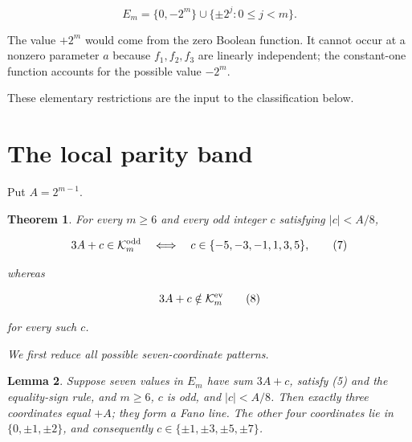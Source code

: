 \documentclass[11pt]{article}
\newtheorem{theorem}{Theorem}
\newtheorem{lemma}[theorem]{Lemma}
\begin{document}
\[
E_m=\{0,-2^m\}\cup\{\pm2^j:0\leq j<m\}.
\tag{6}
\]

The value $+2^m$ would come from the zero Boolean function. It cannot occur at a nonzero parameter
$a$ because $f_1,f_2,f_3$ are linearly independent; the constant-one function accounts for the
possible value $-2^m$.

These elementary restrictions are the input to the classification below.

\section{The local parity band}


Put $A=2^{m-1}$.

\begin{theorem}


For every $m\geq6$ and every odd integer $c$ satisfying $|c|<A/8$,

\[
3A+c\in\mathcal K_m^{\rm odd}
\quad\Longleftrightarrow\quad
c\in\{-5,-3,-1,1,3,5\},
\tag{7}
\]

whereas

\[
3A+c\notin\mathcal K_m^{\rm ev}
\tag{8}
\]

for every such $c$.

We first reduce all possible seven-coordinate patterns.

\end{theorem}

\begin{lemma}


Suppose seven values in $E_m$ have sum $3A+c$, satisfy (5) and the equality-sign rule, and
$m\geq6$, $c$ is odd, and $|c|<A/8$. Then exactly three coordinates equal $+A$; they form a
Fano line. The other four coordinates lie in $\{0,\pm1,\pm2\}$, and consequently
$c\in\{\pm1,\pm3,\pm5,\pm7\}$.

\end{lemma}
\end{document}

